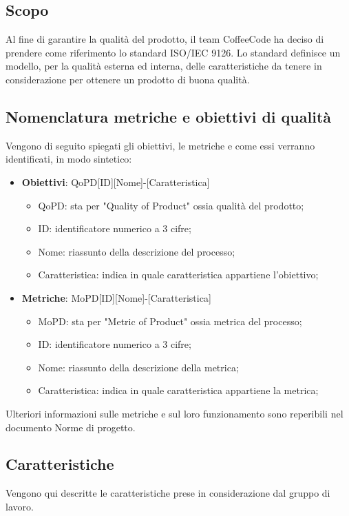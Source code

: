 \documentclass[../piano-di-qualifica.tex]{subfiles}
\begin{document}
\subsection{Scopo}%
\label{sec:scopo}
Al fine di garantire la qualità del prodotto, il team CoffeeCode ha deciso di prendere come riferimento lo standard ISO/IEC 9126.
Lo standard definisce un modello, per la qualità esterna ed interna, delle caratteristiche da tenere in considerazione per ottenere un prodotto di buona qualità.

\subsection{Nomenclatura metriche e obiettivi di qualità}%
\label{sub:nomenclatura_metriche_e_obiettivi_di_qualita}
Vengono di seguito spiegati gli obiettivi, le metriche e come essi verranno identificati, in modo sintetico:
\begin{itemize}
    \item \textbf{Obiettivi}: QoPD[ID][Nome]-[Caratteristica] %
        \begin{itemize}
            \item QoPD: sta per "Quality of Product" ossia qualità del prodotto;
            \item ID: identificatore numerico a 3 cifre;
            \item Nome: riassunto della descrizione del processo;
            \item Caratteristica: indica in quale caratteristica appartiene l'obiettivo;
        \end{itemize}
    \item \textbf{Metriche}: MoPD[ID][Nome]-[Caratteristica] %
        \begin{itemize}
            \item MoPD: sta per "Metric of Product" ossia metrica del processo;
            \item ID: identificatore numerico a 3 cifre;
            \item Nome: riassunto della descrizione della metrica;
            \item Caratteristica: indica in quale caratteristica appartiene la metrica;
        \end{itemize}
\end{itemize}  
Ulteriori informazioni sulle metriche e sul loro funzionamento sono reperibili nel documento Norme di progetto.

\subsection{Caratteristiche}%
\label{sub:caratteristiche}
Vengono qui descritte le caratteristiche prese in considerazione dal gruppo di lavoro.
\end{document}
